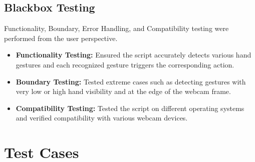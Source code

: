 \documentclass[12pt,a4paper]{report}
\begin{document}
\begin{enumerate}
\subsection{Blackbox Testing}

Functionality, Boundary, Error Handling, and Compatibility testing were performed from the
user perspective.

\begin{itemize}[noitemsep]
  \item \textbf{Functionality Testing:} Ensured the script accurately detects various hand
    gestures and each recognized gesture triggers the corresponding action.
  \item \textbf{Boundary Testing:} Tested extreme cases such as detecting gestures with very
    low or high hand visibility and at the edge of the webcam frame.
  \item \textbf{Compatibility Testing:} Tested the script on different operating systems and
    verified compatibility with various webcam devices.
\end{itemize}
\newpage
\section{Test Cases}


\end{enumerate}
\end{document}

